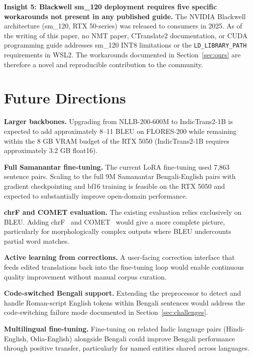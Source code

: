 \documentclass[conference]{IEEEtran}
\begin{document}
\textbf{Insight 5: Blackwell sm\_120 deployment requires five specific
workarounds not present in any published guide.}
The NVIDIA Blackwell architecture (sm\_120, RTX 50-series) was released
to consumers in 2025.
As of the writing of this paper, no NMT paper, CTranslate2 documentation,
or CUDA programming guide addresses sm\_120 INT8 limitations or the
\texttt{LD\_LIBRARY\_PATH} requirements in WSL2.
The workarounds documented in Section~\ref{sec:ours} are therefore a
novel and reproducible contribution to the community.

\section{Future Directions}
\label{sec:future}

\textbf{Larger backbones.}
Upgrading from NLLB-200-600M to IndicTrans2-1B is expected to add
approximately 8--11 BLEU on FLORES-200 while remaining within the 8 GB
VRAM budget of the RTX 5050 (IndicTrans2-1B requires approximately
3.2 GB float16).

\textbf{Full Samanantar fine-tuning.}
The current LoRA fine-tuning used 7,863 sentence pairs.
Scaling to the full 9M Samanantar Bengali-English pairs with
gradient checkpointing and bf16 training is feasible on the RTX 5050
and expected to substantially improve open-domain performance.

\textbf{chrF and COMET evaluation.}
The existing evaluation relies exclusively on BLEU.
Adding chrF~\cite{popovic2015chrf} and COMET~\cite{rei2020comet} would
give a more complete picture, particularly for morphologically complex
outputs where BLEU undercounts partial word matches.

\textbf{Active learning from corrections.}
A user-facing correction interface that feeds edited translations back
into the fine-tuning loop would enable continuous quality improvement
without manual corpus curation.

\textbf{Code-switched Bengali support.}
Extending the preprocessor to detect and handle Roman-script English
tokens within Bengali sentences would address the code-switching failure
mode documented in Section~\ref{sec:challenges}.

\textbf{Multilingual fine-tuning.}
Fine-tuning on related Indic language pairs (Hindi-English,
Odia-English) alongside Bengali could improve Bengali performance
through positive transfer, particularly for named entities shared
across languages.
\end{document}
